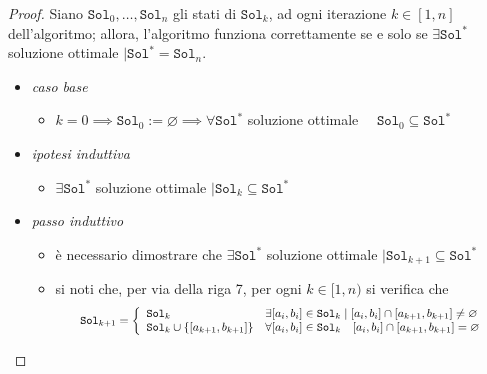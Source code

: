 \documentclass[14pt]{extreport}
\theoremstyle{definition}
\theoremstyle{definition}
\begin{document}
\begin{proof}
    Siano $\texttt{Sol}_0, \ldots, \texttt{Sol}_n$ gli stati di $\texttt{Sol}_k$, ad ogni iterazione $k \in [1, n]$ dell'algoritmo; allora, l'algoritmo funziona correttamente se e solo se $\exists \texttt{Sol}^*$ soluzione ottimale $\mid \texttt{Sol}^* = \texttt{Sol}_n$.
    \begin{itemize}
        \textit{Prima implicazione.} $\exists \texttt{Sol}^*$ soluzione ottimale $\mid \texttt{Sol}_n \subseteq \texttt{Sol}^*$
        \item \textit{caso base}
            \begin{itemize}
                \item $k = 0 \implies \texttt{Sol}_0 := \varnothing \implies \forall \texttt{Sol}^*$ soluzione ottimale $\quad \texttt{Sol}_0 \subseteq \texttt{Sol}^*$
            \end{itemize}
        \item \textit{ipotesi induttiva}
            \begin{itemize}
                \item $\exists \texttt{Sol}^*$ soluzione ottimale $\mid \texttt{Sol}_k \subseteq \texttt{Sol}^*$
            \end{itemize}
        \item \textit{passo induttivo}
            \begin{itemize}
                \item è necessario dimostrare che $\exists \texttt{Sol}^*$ soluzione ottimale $\mid \texttt{Sol}_{k + 1} \subseteq \texttt{Sol}^*$
                \item si noti che, per via della riga 7, per ogni $k \in [1, n)$ si verifica che
                \begin{equation*}
                    \resizebox{.86\hsize}{!}{
                        $\texttt{Sol}_{k + 1} = \left \{ \begin{array}{ll} \texttt{Sol}_k & \exists [a_i, b_i] \in \texttt{Sol}_k \mid [a_i, b_i] \cap [a_{k + 1}, b_{k + 1}] \neq \varnothing \\ \texttt{Sol}_k \cup \{[a_{k + 1}, b_{k + 1}]\} & \forall [a_i, b_i] \in \texttt{Sol}_k \quad [a_i, b_i] \cap [a_{k + 1}, b_{k + 1}] = \varnothing \end{array} \right.$
                }
                \end{equation*}
                

\end{itemize}
\end{itemize}
\end{proof}
\end{document}
